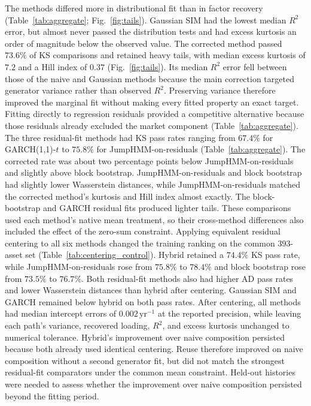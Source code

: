 The methods differed more in distributional fit than in factor
recovery (Table~\ref{tab:aggregate}; Fig.~\ref{fig:tails}).
Gaussian SIM had the lowest median $R^2$ error, but almost never
passed the distribution tests and had excess kurtosis an order of
magnitude below the observed value. The corrected method passed $73.6\%$ of KS
comparisons and retained heavy tails, with median excess kurtosis
of $7.2$ and a Hill index of $0.37$ (Fig.~\ref{fig:tails}). Its
median $R^2$ error fell between those of the naive and Gaussian
methods because the main correction targeted generator variance
rather than observed $R^2$. Preserving variance therefore improved
the marginal fit without making every fitted property an exact
target.
Fitting directly to regression residuals provided a competitive
alternative because those residuals already excluded the market
component (Table~\ref{tab:aggregate}). The three residual-fit methods had KS pass rates ranging
from $67.4\%$ for GARCH(1,1)-$t$ to $75.8\%$ for
JumpHMM-on-residuals (Table~\ref{tab:aggregate}). The corrected rate
was about two percentage points below JumpHMM-on-residuals and
slightly above block bootstrap. JumpHMM-on-residuals and block
bootstrap had slightly lower Wasserstein distances, while
JumpHMM-on-residuals matched the corrected method's kurtosis and Hill
index almost exactly. The block-bootstrap and GARCH residual fits
produced lighter tails. These comparisons used each method's native
mean treatment, so their cross-method differences also included the
effect of the zero-sum constraint.
Applying equivalent residual centering to all six methods changed the
training ranking on the common $393$-asset set
(Table~\ref{tab:centering_control}). Hybrid retained a $74.4\%$ KS
pass rate, while JumpHMM-on-residuals rose from $75.8\%$ to $78.4\%$
and block bootstrap rose from $73.5\%$ to $76.7\%$. Both residual-fit
methods also had higher AD pass rates and lower Wasserstein distances
than hybrid after centering. Gaussian SIM and GARCH remained below
hybrid on both pass rates. After centering, all methods had median
intercept errors of $0.002\,\mathrm{yr}^{-1}$ at the reported precision,
while leaving each path's variance, recovered loading, $R^2$, and
excess kurtosis unchanged to numerical tolerance. Hybrid's improvement
over naive composition persisted because both already used identical
centering. Reuse therefore improved on naive composition without a
second generator fit, but did not match the strongest residual-fit
comparators under the common mean constraint. Held-out histories were
needed to assess whether the improvement over naive composition
persisted beyond the fitting period.

